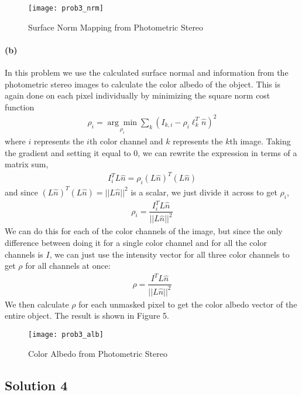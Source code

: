 \documentclass{article}
\newcommand{\solution}[1]{\clearpage \subsection*{Solution #1}}
\newcommand{\spart}[1]{\paragraph{(#1)}}
\begin{document}
\begin{figure*}[!h]
	\centering
	\texttt{[image: prob3\_nrm]}
	\caption{Surface Norm Mapping from Photometric Stereo}
	\label{fig:p3a}
\end{figure*}

\spart{b} In this problem we use the calculated surface normal and information from the photometric stereo images to calculate the color albedo of the object. This is again done on each pixel individually by minimizing the square norm cost function
\begin{align}
	\rho_i = \underset{\rho_i}{\arg \min} \sum_k (I_{k,i} - \rho_i \ell_k^T \hat{n})^2
\end{align}
where $i$ represents the $i$th color channel and $k$ represents the $k$th image. Taking the gradient and setting it equal to 0, we can rewrite the expression in terms of a matrix sum,
\begin{align}
	I_i^T L \hat{n} = \rho_i (L\hat{n})^T(L\hat{n})
\end{align} 
and since $(L\hat{n})^T(L\hat{n}) = ||L\hat{n}||^2$ is a scalar, we just divide it across to get $\rho_i$,
\begin{align}
	\rho_i = \dfrac{I_i^T L\hat{n}}{||L\hat{n}||^2}
\end{align} 
We can do this for each of the color channels of the image, but since the only difference between doing it for a single color channel and for all the color channels is $I$, we can just use the intensity vector for all three color channels to get $\rho$ for all channels at once:
\begin{align}
	\rho = \dfrac{I^T L\hat{n}}{||L\hat{n}||^2}
\end{align}
We then calculate $\rho$ for each unmasked pixel to get the color albedo vector of the entire object. The result is shown in Figure 5.

\begin{figure*}[!h]
	\centering
	\texttt{[image: prob3\_alb]}
	\caption{Color Albedo from Photometric Stereo}
	\label{fig:p3b}
\end{figure*}

\solution{4}
\end{document}
